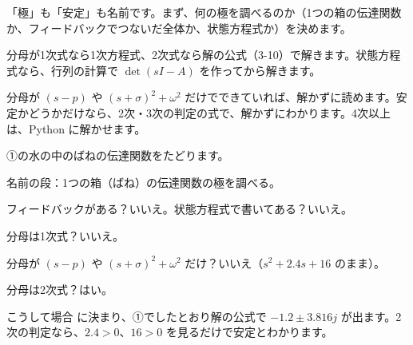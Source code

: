 「極」も「安定」も名前です。まず、何の極を調べるのか（1つの箱の伝達関数か、フィードバックでつないだ全体か、状態方程式か）を決めます。

分母が1次式なら1次方程式、2次式なら解の公式（3-10）で解きます。状態方程式なら、行列の計算で $\det(sI-A)$ を作ってから解きます。

分母が $(s-p)$ や $(s+\sigma)^2+\omega^2$ だけでできていれば、解かずに読めます。安定かどうかだけなら、2次・3次の判定の式で、解かずにわかります。4次以上は、Python に解かせます。


①の水の中のばねの伝達関数をたどります。
\begin{enumerate}[label={\bkcircled[\bkTT]{\arabic*}}, leftmargin=2.4\zw, itemsep=1pt, topsep=2pt]
\item 名前の段：1つの箱（ばね）の伝達関数の極を調べる。
\item フィードバックがある？\enspace いいえ。\enspace 状態方程式で書いてある？\enspace いいえ。
\item 分母は1次式？\enspace いいえ。\par\nobreak\noindent 分母が $(s-p)$ や $(s+\sigma)^2+\omega^2$ だけ？\enspace いいえ（$s^2+2.4s+16$ のまま）。
\item 分母は2次式？\enspace はい。
\end{enumerate}
こうして場合  に決まり、①でしたとおり解の公式で $-1.2\pm3.816j$ が出ます。2次の判定なら、$2.4>0$、$16>0$ を見るだけで安定とわかります。

